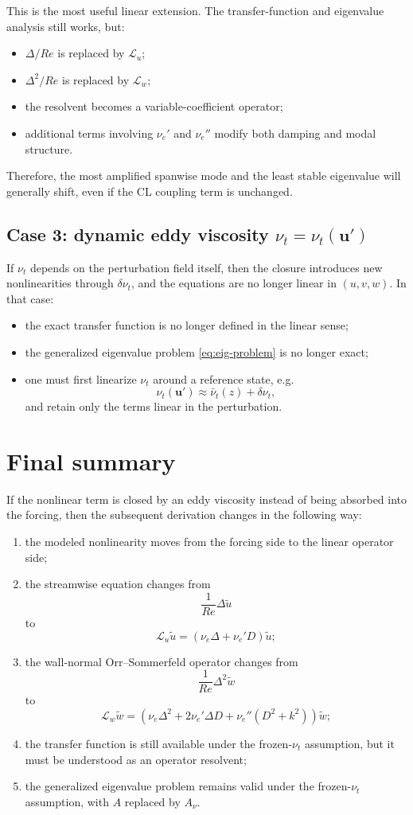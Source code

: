 \documentclass[11pt]{article}
\begin{document}
This is the most useful linear extension. The transfer-function and eigenvalue analysis still works, but:
\begin{itemize}
\item \(\Delta/Re\) is replaced by \(\mathcal L_u\);
\item \(\Delta^2/Re\) is replaced by \(\mathcal L_w\);
\item the resolvent becomes a variable-coefficient operator;
\item additional terms involving \(\nu_e'\) and \(\nu_e''\) modify both damping and modal structure.
\end{itemize}
Therefore, the most amplified spanwise mode and the least stable eigenvalue will generally shift, even if the CL coupling term is unchanged.

\subsection{Case 3: dynamic eddy viscosity \(\nu_t=\nu_t(\bm u')\)}

If \(\nu_t\) depends on the perturbation field itself, then the closure introduces new nonlinearities through \(\delta\nu_t\), and the equations are no longer linear in \((u,v,w)\). In that case:
\begin{itemize}
\item the exact transfer function is no longer defined in the linear sense;
\item the generalized eigenvalue problem \eqref{eq:eig-problem} is no longer exact;
\item one must first linearize \(\nu_t\) around a reference state, e.g.
\[
\nu_t(\bm u') \approx \bar\nu_t(z) + \delta\nu_t,
\]
and retain only the terms linear in the perturbation.
\end{itemize}

\section{Final summary}

If the nonlinear term is closed by an eddy viscosity instead of being absorbed into the forcing, then the subsequent derivation changes in the following way:
\begin{enumerate}
\item the modeled nonlinearity moves from the forcing side to the linear operator side;
\item the streamwise equation changes from
\[
\frac{1}{Re}\Delta \tilde u
\]
to
\[
\mathcal L_u \tilde u
=
\left(\nu_e \Delta + \nu_e' D\right)\tilde u;
\]
\item the wall-normal Orr--Sommerfeld operator changes from
\[
\frac{1}{Re}\Delta^2 \tilde w
\]
to
\[
\mathcal L_w \tilde w
=
\left(\nu_e \Delta^2 + 2\nu_e' \Delta D + \nu_e''(D^2+k^2)\right)\tilde w;
\]
\item the transfer function is still available under the frozen-\(\nu_t\) assumption, but it must be understood as an operator resolvent;
\item the generalized eigenvalue problem remains valid under the frozen-\(\nu_t\) assumption, with \(A\) replaced by \(A_\nu\).
\end{enumerate}
\end{document}
